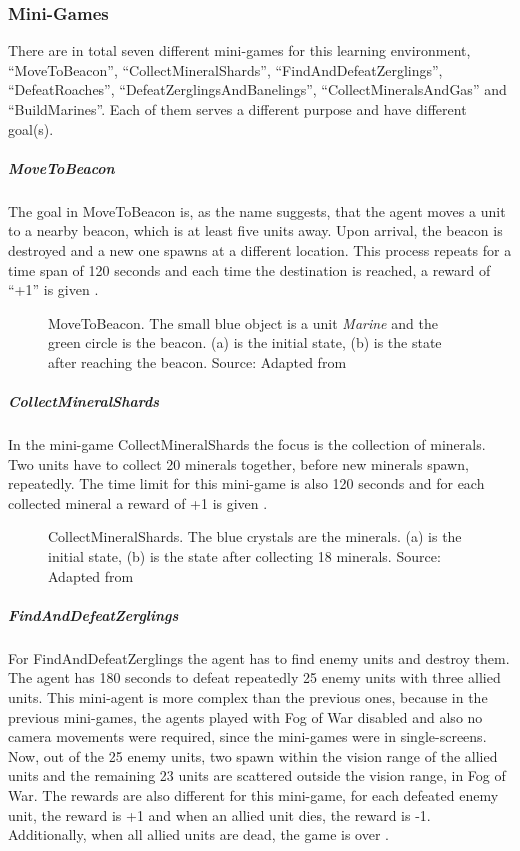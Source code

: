 \subsubsection{Mini-Games}
There are in total seven different mini-games for this learning environment, ``MoveToBeacon'', ``CollectMineralShards'', ``FindAndDefeatZerglings'', ``DefeatRoaches'', ``DefeatZerglingsAndBanelings'', ``CollectMineralsAndGas'' and ``BuildMarines''. Each of them serves a different purpose and have different goal(s). 
\subparagraph{MoveToBeacon}
The goal in MoveToBeacon is, as the name suggests, that the agent moves a unit to a nearby beacon, which is at least five units away. Upon arrival, the beacon is destroyed and a new one spawns at a different location. This process repeats for a time span of 120 seconds and each time the destination is reached, a reward of ``+1'' is given \cite{2017arXiv170804782V}. 
\begin{figure}[H]
	\centering
	\qquad
	\caption[MoveToBeacon]{MoveToBeacon. The small blue object is a unit \textit{Marine} and the green circle is the beacon. (a) is the initial state, (b) is the state after reaching the beacon. Source: Adapted from \protect\cite{sc2_beacon} }
\end{figure}
\subparagraph{CollectMineralShards}
In the mini-game CollectMineralShards the focus is the collection of minerals. Two units have to collect 20 minerals together, before new minerals spawn, repeatedly. The time limit for this mini-game is also 120 seconds and for each collected mineral a reward of +1 is given \cite{2017arXiv170804782V}.
\begin{figure}[H]
	\centering
	\qquad
	\caption[CollectMineralShards]{CollectMineralShards. The blue crystals are the minerals. (a) is the initial state, (b) is the state after collecting 18 minerals. Source: Adapted from \protect\cite{sc2_minerals}}
\end{figure}
\subparagraph{FindAndDefeatZerglings}
For FindAndDefeatZerglings the agent has to find enemy units and destroy them. The agent has 180 seconds to defeat repeatedly 25 enemy units with three allied units. This mini-agent is more complex than the previous ones, because in the previous mini-games, the agents played with Fog of War disabled and also no camera movements were required, since the mini-games were in single-screens. Now, out of the 25 enemy units, two spawn within the vision range of the allied units and the remaining 23 units are scattered outside the vision range, in Fog of War. The rewards are also different for this mini-game, for each defeated enemy unit, the reward is +1 and when an allied unit dies, the reward is -1. Additionally, when all allied units are dead, the game is over \cite{2017arXiv170804782V}.

